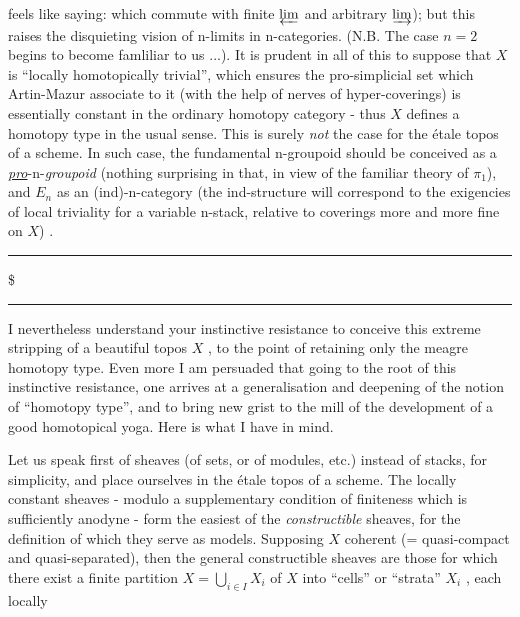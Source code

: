 
feels like saying: which commute with finite $\varprojlim$ and arbitrary $\varinjlim$); but
this raises the disquieting vision of n-limits in n-categories. (N.B. The
case $n = 2$ begins to become famliliar to us ...). It is prudent in all
of this to suppose that $X$ is ``locally homotopically trivial'', which
ensures the pro-simplicial set which Artin-Mazur associate to it (with
the help of nerves of hyper-coverings) is essentially constant in the
ordinary homotopy category - thus $X$ defines a homotopy type in the usual
sense. This is surely \textit{not} the case for the étale topos of a scheme. In
such case, the fundamental n-groupoid should be conceived as a \uline{\textit{pro}}-n-\textit{groupoid}
(nothing surprising in that, in view of the familiar theory of $\pi_1$), and
$E_n$ as an (ind)-n-category (the ind-structure will correspond to the
exigencies of local triviality for a variable n-stack, relative to coverings
more and more fine on $X$) .

\rule{2cm}{0.4pt}\$\rule{2cm}{0.4pt}

 I nevertheless understand your instinctive resistance to conceive
this extreme stripping of a beautiful topos $X$ , to the point of retaining
only the meagre homotopy type. Even more\hand{,} I am persuaded that going to the
root of this instinctive resistance, one arrives at a generalisation and
deepening of the notion of ``homotopy type'', and to bring new grist to the
mill of the development of a good homotopical yoga. Here is what I have
in mind.

Let us speak first of sheaves (of sets, or of modules, etc.) instead
of stacks, for simplicity, and place ourselves in the étale topos of a
scheme. The locally constant sheaves - modulo a supplementary condition
of finiteness which is sufficiently anodyne - form the easiest of the
\textit{constructible} sheaves, for the definition of which they serve as models.
Supposing $X$ coherent (= quasi-compact and quasi-separated), then the
general constructible sheaves are those for which there exist a finite
partition $X = \bigcup_{i\in I} X_i$ of $X$ into ``cells'' or ``strata'' $X_i$ , each locally

